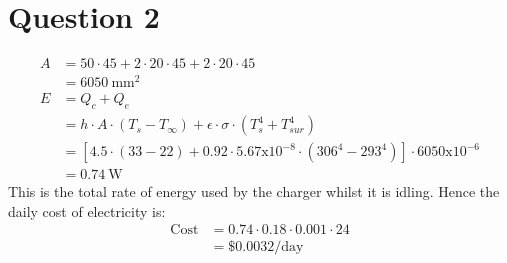 \section{Question 2}
\begin{equation*}
    \begin{split}
        A & = 50  \cdot  45 + 2  \cdot  20  \cdot  45 + 2  \cdot  20  \cdot  45 \\
          & = \SI{6050}{\milli\meter\squared} \\
        E & = Q_{c} + Q_{e} \\
          & = h \cdot A \cdot (T_s - T_{\infty}) + \epsilon \cdot \sigma \cdot (T_{s}^4 + T_{sur}^4) \\
          & = [4.5 \cdot (33 - 22) + 0.92 \cdot 5.67\text{x}10^{-8} \cdot (306^4 - 293^4)] \cdot 6050\text{x}10^{-6} \\
          & = \SI{0.74}{\watt}
    \end{split}
\end{equation*}
This is the total rate of energy used by the charger whilst it is idling. Hence the daily cost of electricity is: \\
\begin{equation*}
    \begin{split}
        \text{Cost} & = 0.74 \cdot 0.18 \cdot 0.001 \cdot 24 \\
        & = \text{\$}0.0032\text{/day}
    \end{split}
\end{equation*}